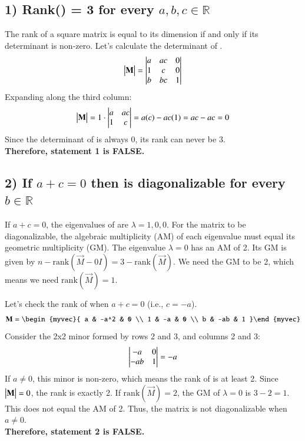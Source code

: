 \documentclass[journal]{IEEEtran}
\begin{document}
\subsection*{1) Rank() = 3 for every $a,b,c \in \mathbb{R}$}
The rank of a square matrix is equal to its dimension if and only if its determinant is non-zero. Let's calculate the determinant of .
\begin{align} 
\mydet{\vec{M}} =  \begin{mydet}{ a & ac & 0 \\ 1 & c & 0 \\ b & bc & 1 }\end{mydet}
\end{align}
Expanding along the third column:
\begin{align}
    \begin{vmatrix}\mathbf{M}\end{vmatrix} = 1 \cdot \begin{vmatrix} a & ac \\ 1 & c \end{vmatrix} = a(c) - ac(1) = ac - ac = 0
\end{align}  
Since the determinant of  is always 0, its rank can never be 3. \\
\textbf{Therefore, statement 1 is FALSE.}

\subsection*{2) If $a + c = 0$ then  is diagonalizable for every $b \in \mathbb{R}$}
If $a+c=0$, the eigenvalues of  are $\lambda = 1, 0, 0$.
For the matrix to be diagonalizable, the algebraic multiplicity (AM) of each eigenvalue must equal its geometric multiplicity (GM). The eigenvalue $\lambda=0$ has an AM of 2. Its GM is given by $n - \text{rank}(\vec{M} - 0I) = 3 - \text{rank}(\vec{M})$. We need the GM to be 2, which means we need $\text{rank}(\vec{M})=1$.

Let's check the rank of  when $a+c=0$ (i.e., $c=-a$).
\begin{align} 
\vec{M} = \begin{myvec}{ a & -a^2 & 0 \\ 1 & -a & 0 \\ b & -ab & 1 }\end{myvec} 
\end{align}
Consider the 2x2 minor formed by rows 2 and 3, and columns 2 and 3:
\begin{align} 
\begin{mydet} {-a & 0 \\ -ab & 1 }\end{mydet} = -a 
\end{align}
If $a \neq 0$, this minor is non-zero, which means the rank of  is at least 2. Since $\begin{vmatrix}\mathbf{M}\end{vmatrix}=0$, the rank is exactly 2. If $\text{rank}(\vec{M})=2$, the GM of $\lambda=0$ is $3-2=1$. This does not equal the AM of 2. Thus, the matrix is not diagonalizable when $a \neq 0$. \\
\textbf{Therefore, statement 2 is FALSE.}
\end{document}
